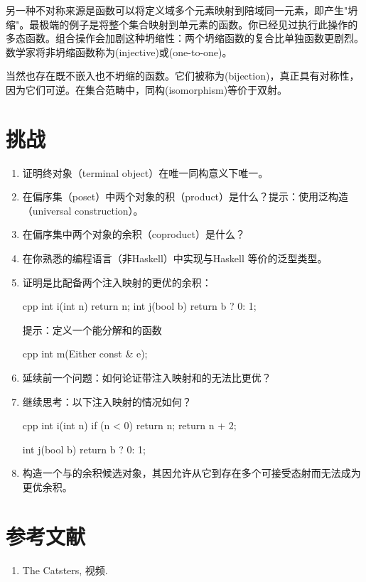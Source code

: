另一种不对称来源是函数可以将定义域多个元素映射到陪域同一元素，即产生"坍缩"。最极端的例子是将整个集合映射到单元素的函数。你已经见过执行此操作的多态函数。组合操作会加剧这种坍缩性：两个坍缩函数的复合比单独函数更剧烈。数学家将非坍缩函数称为(injective)或(one-to-one)。

当然也存在既不嵌入也不坍缩的函数。它们被称为(bijection)，真正具有对称性，因为它们可逆。在集合范畴中，同构(isomorphism)等价于双射。

\section{挑战}

\begin{enumerate}
  \tightlist
  \item
        证明终对象（terminal object）在唯一同构意义下唯一。
  \item
        在偏序集（poset）中两个对象的积（product）是什么？提示：使用泛构造（universal construction）。
  \item
        在偏序集中两个对象的余积（coproduct）是什么？
  \item
        在你熟悉的编程语言（非Haskell）中实现与Haskell 等价的泛型类型。
  \item
        证明是比配备两个注入映射的更优的余积：
        
        \begin{snip}{cpp}
int i(int n) { return n; }
int j(bool b) { return b ? 0: 1; }
\end{snip}

        提示：定义一个能分解和的函数
        
        \begin{snip}{cpp}
int m(Either const & e);
\end{snip}
  \item
        延续前一个问题：如何论证带注入映射和的无法比更优？
  \item
        继续思考：以下注入映射的情况如何？

        \begin{snip}{cpp}
int i(int n) {
    if (n < 0) return n;
    return n + 2;
}

int j(bool b) { return b ? 0: 1; }
\end{snip}
  \item
        构造一个与的余积候选对象，其因允许从它到存在多个可接受态射而无法成为更优余积。
\end{enumerate}

\section{参考文献}

\begin{enumerate}
  \tightlist
  \item
        The Catsters,
         视频.
\end{enumerate}